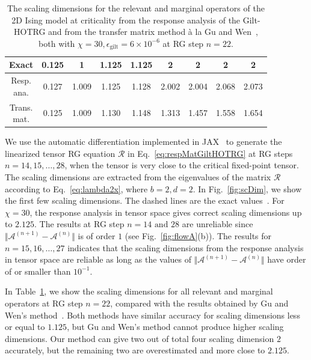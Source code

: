 \documentclass[aps,prb,reprint,superscriptaddress,floatfix]{revtex4-2}
\begin{document}
\begin{table}[tb]%
\caption{The scaling dimensions for the relevant and marginal operators
    of the 2D Ising model at criticality from the response analysis of
    the Gilt-HOTRG and from the transfer matrix method \`a la Gu and
    Wen~\cite{GuWen2009}, both with $\chi = 30, \epsilon_{\text{gilt}} =
    6\times 10^{-6}$ at RG step $n = 22$.\label{table:scDim}} 
\begin{ruledtabular}
\begin{tabular}{ c c c c c c c c c }
Exact      & 0.125 & 1 & 1.125 & 1.125 & 2 & 2 & 2 & 2 \\
\hline
\thead{Resp.\\ ana.} & 0.127 & 1.009 & 1.125 & 1.128 & 2.002 &
2.004 & 2.068 & 2.073 \\
\thead{Trans.\\ mat.} & 0.125 & 1.009 & 1.130 & 1.148 & 1.313 &
1.457 & 1.558 & 1.654
\end{tabular}
\end{ruledtabular}
\end{table}
%

We use the automatic differentiation implemented in JAX~\cite{jax2018github} to generate the linearized tensor RG equation $\mathcal{R}$ in Eq.~\eqref{eq:respMatGiltHOTRG} at RG steps $n = 14,15,\ldots, 28$, when the tensor is very close to the critical fixed-point tensor. 
The scaling dimensions are extracted from the eigenvalues of the matrix $\mathcal{R}$ according to Eq.~\eqref{eq:lambda2x}, where $b = 2, d = 2$. 
In Fig.~\ref{fig:scDim}, we show the first few scaling dimensions. 
The dashed lines are the exact values~\cite{DiFrancesco1997}. 
For $\chi = 30$, the response analysis in tensor space gives correct scaling dimensions up to $2.125$. 
The results at RG step $n = 14 \text{ and } 28$ are unreliable since $\Vert \mathcal{A}^{(n+1)} - \mathcal{A}^{(n)}\Vert$ is of order $1$ (see Fig.~\ref{fig:flowA}(b)). 
The results for $n = 15,16,\ldots,27$ indicates that the scaling dimensions from the response analysis in tensor space are reliable as long as the values of $\Vert \mathcal{A}^{(n+1)} - \mathcal{A}^{(n)}\Vert$ have order of or smaller than $10^{-1}$. 
%

In Table~\ref{table:scDim}, we show the scaling dimensions for all relevant and marginal operators at RG step $n = 22$, compared with the results obtained by Gu and Wen's method~\cite{GuWen2009}. 
Both methods have similar accuracy for scaling dimensions less or equal to $1.125$, but Gu and Wen's method cannot produce higher scaling dimensions. 
Our method can give two out of total four scaling dimension $2$ accurately, but the remaining two are overestimated and more close to $2.125$.
%
\end{document}
